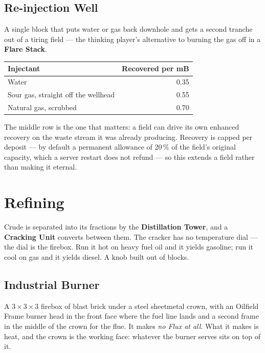 \subsection*{Re-injection Well}

A single block that puts water or gas back downhole and gets a second tranche out of a tiring
field --- the thinking player's alternative to burning the gas off in a \textbf{Flare Stack}.

\begin{center}
\small
\begin{tabular}{@{}lr@{}}
\toprule
Injectant & Recovered per mB \\
\midrule
Water                                & 0.35 \\
Sour gas, straight off the wellhead  & 0.55 \\
Natural gas, scrubbed                & 0.70 \\
\bottomrule
\end{tabular}
\end{center}

The middle row is the one that matters: a field can drive its own enhanced recovery on the waste
stream it was already producing. Recovery is capped per deposit --- by default a permanent
allowance of 20\,\% of the field's original capacity, which a server restart does not refund --- so
this extends a field rather than making it eternal.

\section{Refining}

Crude is separated into its fractions by the \textbf{Distillation Tower}, and a \textbf{Cracking
Unit} converts between them. The cracker has no temperature dial --- the dial is the firebox. Run
it hot on heavy fuel oil and it yields gasoline; run it cool on gas and it yields diesel. A knob
built out of blocks.

\subsection*{Industrial Burner}

A $3\times3\times3$ firebox of blast brick under a steel sheetmetal crown, with an Oilfield Frame
burner head in the front face where the fuel line lands and a second frame in the middle of the
crown for the flue. It makes \emph{no Flux at all}. What it makes is heat, and the crown is the
working face: whatever the burner serves sits on top of it.


